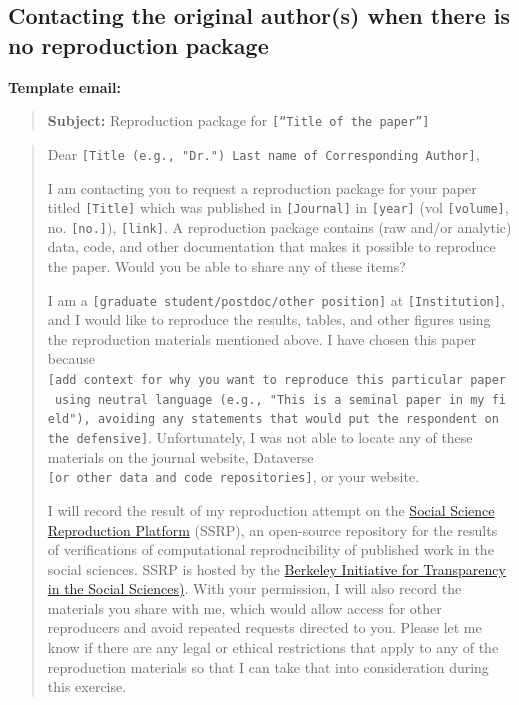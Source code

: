 \documentclass[
]{book}
\begin{document}
\hypertarget{contacting-the-original-authors-when-there-is-no-reproduction-package}{%
\subsection{Contacting the original author(s) when there is no reproduction package}\label{contacting-the-original-authors-when-there-is-no-reproduction-package}}

\textbf{Template email:}

\begin{quote}
\textbf{Subject:} Reproduction package for \texttt{{[}“Title\ of\ the\ paper”{]}}
\end{quote}

\begin{quote}
Dear \texttt{{[}Title\ (e.g.,\ "Dr.")\ Last\ name\ of\ Corresponding\ Author{]}},

I am contacting you to request a reproduction package for your paper titled \texttt{{[}Title{]}} which was published in \texttt{{[}Journal{]}} in \texttt{{[}year{]}} (vol \texttt{{[}volume{]}}, no. \texttt{{[}no.{]}}), \texttt{{[}link{]}}. A reproduction package contains (raw and/or analytic) data, code, and other documentation that makes it possible to reproduce the paper. Would you be able to share any of these items?

I am a \texttt{{[}graduate\ student/postdoc/other\ position{]}} at \texttt{{[}Institution{]}}, and I would like to reproduce the results, tables, and other figures using the reproduction materials mentioned above. I have chosen this paper because \texttt{{[}add\ context\ for\ why\ you\ want\ to\ reproduce\ this\ particular\ paper\ using\ neutral\ language\ (e.g.,\ "This\ is\ a\ seminal\ paper\ in\ my\ field"),\ avoiding\ any\ statements\ that\ would\ put\ the\ respondent\ on\ the\ defensive{]}}. Unfortunately, I was not able to locate any of these materials on the journal website, Dataverse \texttt{{[}or\ other\ data\ and\ code\ repositories{]}}, or your website.

I will record the result of my reproduction attempt on the \href{https://www.socialsciencereproduction.org/}{Social Science Reproduction Platform} (SSRP), an open-source repository for the results of verifications of computational reproducibility of published work in the social sciences. SSRP is hosted by the \href{https://www.bitss.org/}{Berkeley Initiative for Transparency in the Social Sciences)}. With your permission, I will also record the materials you share with me, which would allow access for other reproducers and avoid repeated requests directed to you. Please let me know if there are any legal or ethical restrictions that apply to any of the reproduction materials so that I can take that into consideration during this exercise.


\end{quote}
\end{document}
